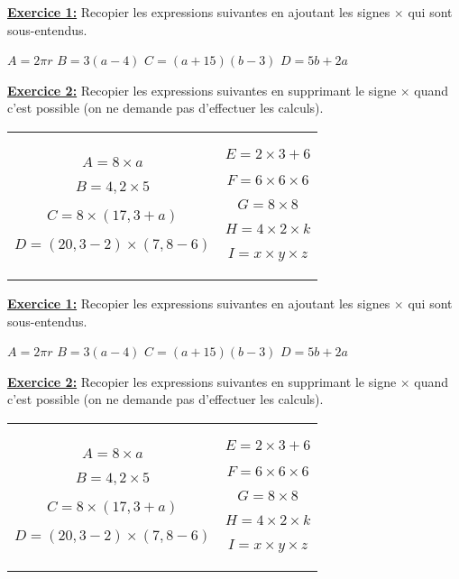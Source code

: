 \documentclass[12pt, twoside]{article}
\begin{document}
\ul{\textbf{Exercice 1:}} Recopier les expressions suivantes en ajoutant les
signes $\times$ qui sont sous-entendus.

\begin{center}
$A=2 \pi r$ \qquad $B=3(a-4)$ \qquad $C=(a+15)(b-3)$ \qquad $D=5b+2a$
\end{center}

\bigskip

\ul{\textbf{Exercice 2:}} Recopier les expressions suivantes en supprimant le
signe $\times$ quand c'est possible (on ne demande pas d'effectuer les calculs).


\begin{tabular}{cc}
\begin{minipage}{9cm}
$A=8 \times a$

$B=4,2 \times 5$

$C=8 \times (17,3 + a)$

$D=(20,3-2) \times (7,8 -6)$

\end{minipage}
&
\begin{minipage}{9cm}
$E=2 \times 3+6$

$F=6 \times 6 \times 6$

$G=8 \times 8$

$H=4 \times  2 \times k$

$I=x \times y \times z$

\end{minipage}
\end{tabular}

\bigskip

\bigskip

\ul{\textbf{Exercice 1:}} Recopier les expressions suivantes en ajoutant les
signes $\times$ qui sont sous-entendus.

\begin{center}
$A=2 \pi r$ \qquad $B=3(a-4)$ \qquad $C=(a+15)(b-3)$ \qquad $D=5b+2a$
\end{center}

\bigskip

\ul{\textbf{Exercice 2:}} Recopier les expressions suivantes en supprimant le
signe $\times$ quand c'est possible (on ne demande pas d'effectuer les calculs).


\begin{tabular}{cc}
\begin{minipage}{9cm}
$A=8 \times a$

$B=4,2 \times 5$

$C=8 \times (17,3 + a)$

$D=(20,3-2) \times (7,8 -6)$

\end{minipage}
&
\begin{minipage}{9cm}
$E=2 \times 3+6$

$F=6 \times 6 \times 6$

$G=8 \times 8$

$H=4 \times  2 \times k$

$I=x \times y \times z$

\end{minipage}
\end{tabular}
\end{document}
